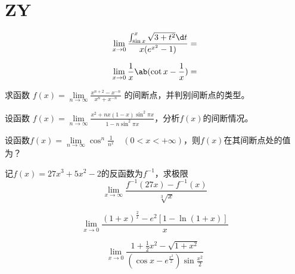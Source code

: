 \section{ZY}
\begin{question}
    \begin{equation}
        \nonumber
        \lim\limits_{ x \to 0 } \frac{ \int_{\sin x}^{x} \sqrt{ 3 + t^2 } \d t }{ x ( e^{x^2} - 1 ) } = 
    \end{equation}
\end{question}
\begin{question}
    \begin{equation}
        \nonumber
        \lim\limits_{ x \to 0 } \frac{1}{x} \ab( \cot x - \frac{1}{x} ) = 
    \end{equation}
\end{question}
\begin{question}
    求函数 $ f(x) = \lim\limits_{ n \to \infty } \frac{ x^{ n + 2 } - x^{ -n } }{ x^n + x^{ -n } } $ 的间断点，并判别间断点的类型。
\end{question}
\begin{question}
    设函数 $ f(x) = \lim\limits_{ n \to \infty } \frac{ x^2 + nx( 1 - x ) \sin ^2 \pi x }{ 1 - n \sin^2 \pi x } $，分析$ f(x) $的间断情况。 
\end{question}
\begin{question}
    设函数$ f(x) =\lim\limits_{ n \to \infty } \cos^n \frac{ 1 }{ n^x } \quad (0 < x < + \infty) $，则$ f(x) $在其间断点处的值为？
\end{question}
\begin{question}
    记$ f(x) = 27x^3 + 5x^2 - 2 $的反函数为$ f^{-1} $，求极限
    \begin{equation}
        \nonumber
        \lim\limits_{ x \to \infty } \frac{ f^{-1} (27x) - f^{-1} (x) }{ \sqrt[3]{x} }
    \end{equation}
\end{question}
\begin{question}
    \begin{equation}
        \nonumber
        \lim\limits_{x \to 0} \frac{ (1 + x) ^ \frac{2}{x} - e^2 [1 - \ln(1 + x)] }{x}
    \end{equation}
\end{question}
\begin{question}
    \begin{equation}
        \nonumber
        \lim\limits_{x \to 0} \frac{ 1 + \frac{1}{2} x^2 - \sqrt{ 1 + x^2 } }{ ( \cos x - e^{ \frac{x^2}{2} }) \sin \frac{x^2}{2} }
    \end{equation}
\end{question}
